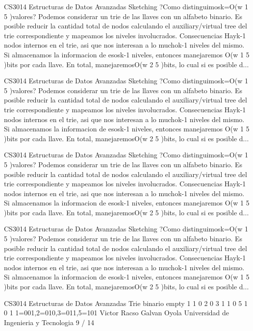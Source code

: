 \begin{description}[leftmargin=!,labelwidth=4.2em,style=nextline]
\item[Pag. 29] CS3014 Estructuras de Datos Avanzadas Sketching ?Como distinguimosk=O(w 1 5 )valores? Podemos considerar un trie de las llaves con un alfabeto binario. Es posible reducir la cantidad total de nodos calculando el auxiliary/virtual tree del trie correspondiente y mapeamos los niveles involucrados. Consecuencias Hayk-1 nodos internos en el trie, asi que nos interesan a lo muchok-1 niveles del mismo. Si almacenamos la informacion de esosk-1 niveles, entonces manejaremos O(w 1 5 )bits por cada llave. En total, manejaremosO(w 2 5 )bits, lo cual si es posible d...
\item[Pag. 30] CS3014 Estructuras de Datos Avanzadas Sketching ?Como distinguimosk=O(w 1 5 )valores? Podemos considerar un trie de las llaves con un alfabeto binario. Es posible reducir la cantidad total de nodos calculando el auxiliary/virtual tree del trie correspondiente y mapeamos los niveles involucrados. Consecuencias Hayk-1 nodos internos en el trie, asi que nos interesan a lo muchok-1 niveles del mismo. Si almacenamos la informacion de esosk-1 niveles, entonces manejaremos O(w 1 5 )bits por cada llave. En total, manejaremosO(w 2 5 )bits, lo cual si es posible d...
\item[Pag. 31] CS3014 Estructuras de Datos Avanzadas Sketching ?Como distinguimosk=O(w 1 5 )valores? Podemos considerar un trie de las llaves con un alfabeto binario. Es posible reducir la cantidad total de nodos calculando el auxiliary/virtual tree del trie correspondiente y mapeamos los niveles involucrados. Consecuencias Hayk-1 nodos internos en el trie, asi que nos interesan a lo muchok-1 niveles del mismo. Si almacenamos la informacion de esosk-1 niveles, entonces manejaremos O(w 1 5 )bits por cada llave. En total, manejaremosO(w 2 5 )bits, lo cual si es posible d...
\item[Pag. 32] CS3014 Estructuras de Datos Avanzadas Sketching ?Como distinguimosk=O(w 1 5 )valores? Podemos considerar un trie de las llaves con un alfabeto binario. Es posible reducir la cantidad total de nodos calculando el auxiliary/virtual tree del trie correspondiente y mapeamos los niveles involucrados. Consecuencias Hayk-1 nodos internos en el trie, asi que nos interesan a lo muchok-1 niveles del mismo. Si almacenamos la informacion de esosk-1 niveles, entonces manejaremos O(w 1 5 )bits por cada llave. En total, manejaremosO(w 2 5 )bits, lo cual si es posible d...
\item[Pag. 33] CS3014 Estructuras de Datos Avanzadas Trie binario empty 1 1 0 2 0 3 1 1 0 5 1 0 1 1=001,2=010,3=011,5=101 Victor Racso Galvan Oyola Universidad de Ingenieria y Tecnologia 9 / 14

\end{description}
